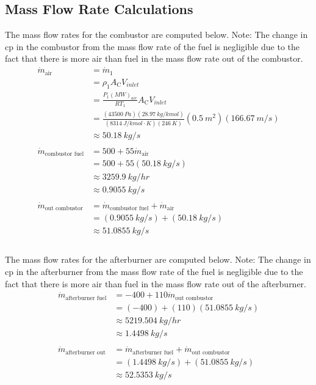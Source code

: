 \documentclass[11pt]{article} %
\begin{document}
\subsection*{Mass Flow Rate Calculations}
The mass flow rates for the combustor are computed below. Note: The change in cp in the combustor from the mass flow rate of the fuel is negligible due to the fact that there is more air than fuel in the mass flow rate out of the combustor.
\begin{align*}
\dot{m}_{\text{air}} &= \dot{m}_{\text{1}} \\
&= \rho_1 A_{\text{C}} V_{inlet} \\
&= \frac{P_1 (MW)_{air}}{RT_1}A_{\text{C}} V_{inlet} \\
&= \frac{ (43500\ \si{Pa})(28.97\ \si{kg/kmol})}{(8314\ \si{J/kmol\cdot K})(246\ K)}(0.5\ \si{m^2})(166.67\ \si{m/s}) \\
&\approx 50.18\ \si{kg/s} \\\\
\dot{m}_{\text{combustor fuel}} &= 500 + 55\dot{m}_{\text{air}} \\
&= 500 + 55(50.18\ \si{kg/s}) \\
&\approx 3259.9\ \si{kg/hr} \\
&\approx 0.9055\ \si{kg/s} \\\\
\dot{m}_{\text{out combustor}} &= \dot{m}_{\text{combustor fuel}} + \dot{m}_{\text{air}} \\
&= (0.9055\ \si{kg/s}) + (50.18\ \si{kg/s}) \\
&\approx 51.0855\ \si{kg/s} \\\\
\end{align*}

The mass flow rates for the afterburner are computed below. Note: The change in cp in the afterburner from the mass flow rate of the fuel is negligible due to the fact that there is more air than fuel in the mass flow rate out of the afterburner.
\begin{align*}
\dot m_{\text{afterburner fuel}} &= -400 + 110 \dot m_{\text{out combustor}} \\
&= (-400) + (110)(51.0855\ \si{kg/s}) \\
&\approx 5219.504\ \si{kg/hr} \\
&\approx 1.4498\ \si{kg/s}\\\\
\dot m_{\text{afterburner out}} &= \dot m_{\text{afterburner fuel}} + \dot m_{\text{out combustor}} \\
&= (1.4498\ \si{kg/s}) + (51.0855\ \si{kg/s}) \\
&\approx 52.5353\ \si{kg/s}
\end{align*}
\end{document}
